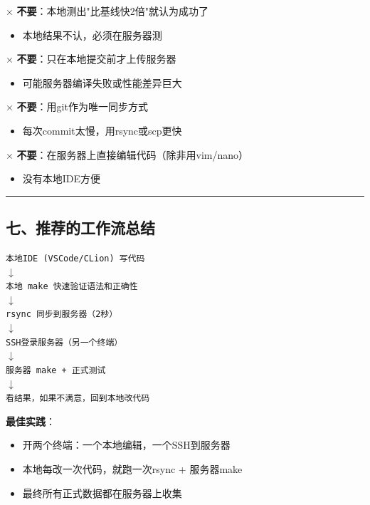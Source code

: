 \documentclass[11pt, a4paper]{article}
\begin{document}
\begin{aibox}
$\times$ \textbf{不要}：本地测出"比基线快2倍"就认为成功了
\begin{itemize}
    \item 本地结果不认，必须在服务器测
\end{itemize}

$\times$ \textbf{不要}：只在本地提交前才上传服务器
\begin{itemize}
    \item 可能服务器编译失败或性能差异巨大
\end{itemize}

$\times$ \textbf{不要}：用git作为唯一同步方式
\begin{itemize}
    \item 每次commit太慢，用rsync或scp更快
\end{itemize}

$\times$ \textbf{不要}：在服务器上直接编辑代码（除非用vim/nano）
\begin{itemize}
    \item 没有本地IDE方便
\end{itemize}

\begin{center}\rule{\textwidth}{0.4pt}\end{center}

\subsection*{七、推荐的工作流总结}

\begin{tcolorbox}[colback=white,colframe=gray!50!white,boxrule=0.5pt,arc=2pt,left=5pt,right=5pt,top=5pt,bottom=5pt]
\texttt{本地IDE (VSCode/CLion) 写代码}\\
\texttt{\quad $\downarrow$}\\
\texttt{本地 make 快速验证语法和正确性}\\
\texttt{\quad $\downarrow$}\\
\texttt{rsync 同步到服务器（2秒）}\\
\texttt{\quad $\downarrow$}\\
\texttt{SSH登录服务器（另一个终端）}\\
\texttt{\quad $\downarrow$}\\
\texttt{服务器 make + 正式测试}\\
\texttt{\quad $\downarrow$}\\
\texttt{看结果，如果不满意，回到本地改代码}
\end{tcolorbox}

\textbf{最佳实践}：
\begin{itemize}
    \item 开两个终端：一个本地编辑，一个SSH到服务器
    \item 本地每改一次代码，就跑一次rsync + 服务器make
    \item 最终所有正式数据都在服务器上收集
\end{itemize}


\end{aibox}
\end{document}
